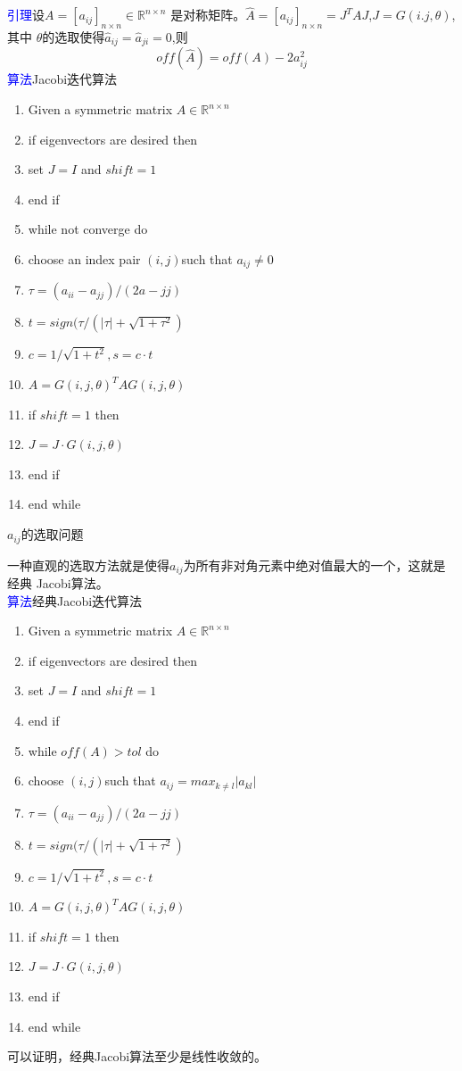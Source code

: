 \documentclass[12pt,a4paper]{article}
\begin{document}
\textcolor{blue}{引理}\quad 设$A=[a_{ij}]_{n\times n}\in \mathbb{R}^{n\times n}$
是对称矩阵。$\widehat{A}=[a_{ij}]_{n\times n}=J^TAJ$,$J=G(i.j,\theta)$,其中
$\theta$的选取使得$\widehat a_{ij}=\widehat a_{ji}=0$,则$$off(\widehat
A)=off(A)-2a_{ij}^2$$
\textcolor{blue}{算法}\quad Jacobi迭代算法
\begin{enumerate}[1:]
	\item Given a symmetric matrix $A\in \mathbb R^{n\times n}$
	\item if eigenvectors are desired then
	\item \quad set $J=I$ and $shift=1$
	\item end if
	\item while not converge do
	\item \quad choose an index pair $(i,j)$such that $a_{ij}\neq 0$
	\item \quad $\tau=(a_{ii}-a_{jj})/(2a-{jj})$
	\item \quad $t=sign(\tau/(|\tau|+\sqrt{1+\tau ^2})$
	\item \quad $c=1/\sqrt{1+t^2},s=c·t$
	\item \quad $A=G(i,j,\theta)^TAG(i,j,\theta)$
	\item \quad if $shift=1$ then 
	\item \qquad $J=J·G(i,j,\theta)$
	\item \quad end if
	\item end while
\end{enumerate}
$a_{ij}$的选取问题

一种直观的选取方法就是使得$a_{ij}$为所有非对角元素中绝对值最大的一个，这就是经典
Jacobi算法。\\
\textcolor{blue}{算法}\quad 经典Jacobi迭代算法
\begin{enumerate}[1:]
	\item Given a symmetric matrix $A\in \mathbb R^{n\times n}$  
	\item if eigenvectors are desired then  
	\item \quad set $J=I$ and $shift=1$  
	\item end if  
	\item while $off(A)>tol $ do
	\item \quad choose $(i,j)$such that $a_{ij}=max_{k\neq l}|a_{kl}|$  
	\item \quad $\tau=(a_{ii}-a_{jj})/(2a-{jj})$  
	\item \quad $t=sign(\tau/(|\tau|+\sqrt{1+\tau ^2})$  
	\item \quad $c=1/\sqrt{1+t^2},s=c·t$  
	\item \quad $A=G(i,j,\theta)^TAG(i,j,\theta)$  
	\item \quad if $shift=1$ then   
	\item \qquad $J=J·G(i,j,\theta)$  
	\item \quad end if  
	\item end while  
\end{enumerate}  
可以证明，经典Jacobi算法至少是线性收敛的。
\end{document}
